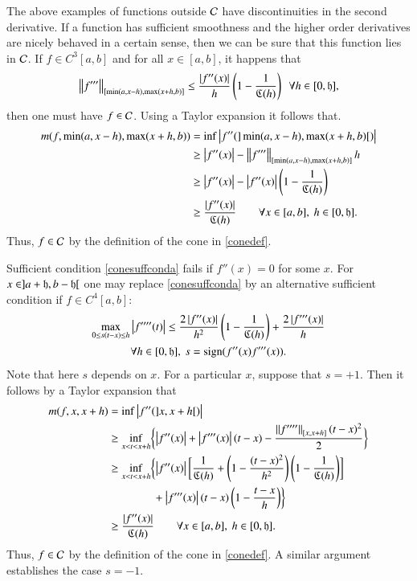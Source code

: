 \documentclass[review]{elsarticle}
\theoremstyle{definition}
\begin{document}
The above examples of functions outside $\cc$ have discontinuities in the second
derivative.  If a function has sufficient smoothness and the higher order derivatives are nicely behaved in a certain sense, then we can be sure that this function lies in $\cc$.   If  $f \in C^3[a,b]$ and for all $x \in [a,b]$, it happens that
\begin{equation} \label{conesuffconda}
\norm[{[\min(a,x-h),\max(x+h,b)]}]{f'''} \le \frac{\abs{f''(x)}}{h} \left( 1 - \frac{1}{\fC(h)} \right) \ \ \forall h \in [0,\fh],
\end{equation}
then one must have $f \in \cc$.  Using a Taylor expansion it follows that.
\begin{align*}
m(f,\min(a,x-h),\max(x+h,b)) & = \inf \abs{f''(]\min(a,x-h),\max(x+h,b)[)} \\
& \ge \abs{f''(x)}  - \norm[{[\min(a,x-h),\max(x+h,b)]}]{f'''}h \\
& \ge \abs{f''(x)}  - \abs{f''(x)}\left( 1 - \frac{1}{\fC(h)} \right) \\
& \ge \frac{\abs{f''(x)}}{\fC(h)} \qquad \forall x \in [a,b],\ h \in [0,\fh].
\end{align*}
Thus, $f \in \cc$ by the definition of the cone in \eqref{conedef}.

Sufficient condition \eqref{conesuffconda} fails if $f''(x) = 0$ for some $x$.  For $x \in ]a + \fh, b-\fh[$ one may replace \eqref{conesuffconda} by an alternative sufficient condition if  $f \in C^4[a,b]$:
\begin{multline} \label{conesuffcondb}
\max_{0 \le s(t-x) \le h }{\abs{f''''(t)}} \le \frac{2\abs{f''(x)}}{h^2} \left( 1 - \frac{1}{\fC(h)} \right) +  \frac{2\abs{f'''(x)}}{h}  \\ \forall  h \in [0,\fh], \ s = \sign(f''(x)f'''(x)).
\end{multline}
Note that here $s$ depends on $x$.  For a particular $x$, suppose that $s = +1$.  Then it follows by a Taylor expansion that
\begin{align*}
m(f,x,x+h) & = \inf \abs{f''(]x,x+h[)} \\
& \ge \inf_{x < t < x+h} \biggl\{ \abs{f''(x)} + \abs{f'''(x)}(t-x)  - \frac{\norm[{[x,x+h]}]{f''''}(t-x)^2}{2} \biggr\}\\
& \ge \inf_{x < t < x+h} \biggl\{ \abs{f''(x)} \biggl[ \frac{1}{\fC(h)} + \left(1 - \frac{(t-x)^2}{h^2}\right)\left(1 - \frac{1}{\fC(h)}\right) \biggr] \\
& \qquad \qquad + \abs{f'''(x)}(t-x)\left(1 -  \frac{t-x}{h}\right)  \biggr\}\\
& \ge  \frac{\abs{f''(x)}}{\fC(h)} \qquad \forall x \in [a,b],\ h \in [0,\fh].
\end{align*}
Thus, $f \in \cc$ by the definition of the cone in \eqref{conedef}.  A similar argument establishes the case $s = -1$.
\end{document}

